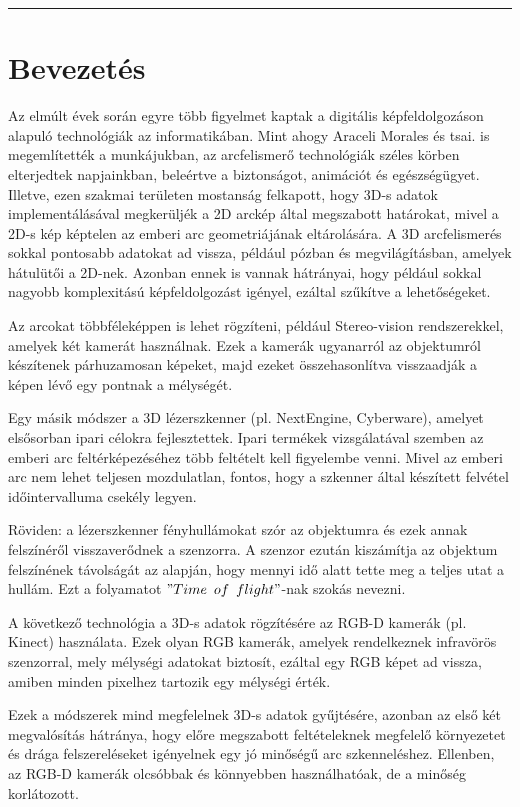 \documentclass[12pt,a4]{article}
\begin{document}
	\par\noindent\rule{\textwidth}{0.4pt}

    \section{Bevezetés}
        Az elmúlt évek során egyre több figyelmet kaptak a digitális képfeldolgozáson alapuló technológiák az informatikában. 
        Mint ahogy Araceli Morales és tsai. \cite{survey} is megemlítették a munkájukban, az arcfelismerő technológiák széles körben elterjedtek napjainkban, beleértve a biztonságot, animációt és egészségügyet. 
        Illetve, ezen szakmai területen mostanság felkapott, hogy 3D-s adatok implementálásával megkerüljék a 2D arckép által megszabott határokat, mivel a 2D-s kép képtelen az emberi arc geometriájának eltárolására.
        A 3D arcfelismerés sokkal pontosabb adatokat ad vissza, például pózban és megvilágításban, amelyek hátulütői a 2D-nek. Azonban ennek is vannak hátrányai, hogy például sokkal nagyobb komplexitású képfeldolgozást igényel, ezáltal szűkítve a lehetőségeket.

        Az arcokat többféleképpen is lehet rögzíteni, például Stereo-vision rendszerekkel, amelyek két kamerát használnak. Ezek a kamerák ugyanarról az objektumról készítenek párhuzamosan képeket, majd ezeket összehasonlítva visszaadják a képen lévő egy pontnak a mélységét.

        Egy másik módszer a 3D lézerszkenner (pl. NextEngine, Cyberware), amelyet elsősorban ipari célokra fejlesztettek. Ipari termékek vizsgálatával szemben az emberi arc feltérképezéséhez több feltételt kell figyelembe venni. Mivel az emberi arc nem lehet teljesen mozdulatlan, fontos, hogy a szkenner által készített felvétel időintervalluma csekély legyen.

        Röviden: a lézerszkenner fényhullámokat szór az objektumra és ezek annak felszínéről visszaverődnek a szenzorra. A szenzor ezután kiszámítja az objektum felszínének távolságát az alapján, hogy mennyi idő alatt tette meg a teljes utat a hullám. Ezt a folyamatot $"Time\enspace of\enspace flight"$-nak szokás nevezni.

        A következő technológia a 3D-s adatok rögzítésére az RGB-D kamerák (pl. Kinect) használata. Ezek olyan RGB kamerák, amelyek rendelkeznek infravörös szenzorral, mely mélységi adatokat biztosít, ezáltal egy RGB képet ad vissza, amiben minden pixelhez tartozik egy mélységi érték.

        Ezek a módszerek mind megfelelnek 3D-s adatok gyűjtésére, azonban az első két megvalósítás hátránya, hogy előre megszabott feltételeknek megfelelő környezetet és drága felszereléseket igényelnek egy jó minőségű arc szkenneléshez. Ellenben, az RGB-D kamerák olcsóbbak és könnyebben használhatóak, de a minőség korlátozott.
\end{document}
